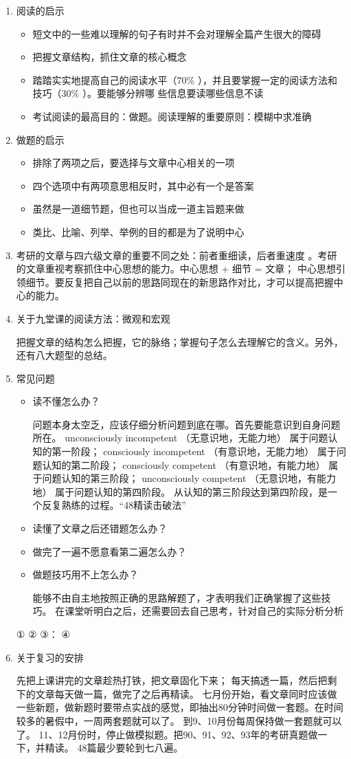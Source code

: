 \documentclass[11pt,twoside,openany,x11names,svgnames]{memoir}
\begin{document}
\begin{enumerate}
  \item 阅读的启示
  \begin{itemize}
  \item 短文中的一些难以理解的句子有时并不会对理解全篇产生很大的障碍
  \item 把握文章结构，抓住文章的核心概念
  \item 踏踏实实地提高自己的阅读水平（70\% ），并且要掌握一定的阅读方法和技巧（30\% ）。要能够分辨哪
些信息要读哪些信息不读
  \item 考试阅读的最高目的：做题。阅读理解的重要原则：模糊中求准确
\end{itemize}
  \item 做题的启示
  \begin{itemize}
  \item 排除了两项之后，要选择与文章中心相关的一项
  \item 四个选项中有两项意思相反时，其中必有一个是答案
  \item 虽然是一道细节题，但也可以当成一道主旨题来做
  \item 类比、比喻、列举、举例的目的都是为了说明中心
\end{itemize}
  \item 考研的文章与四六级文章的重要不同之处：前者重细读，后者重速度 。考研的文章重视考察抓住中心思想的能力。中心思想 + 细节 = 文章；  中心思想引领细节。要反复把自己以前的思路同现在的新思路作对比，才可以提高把握中心的能力。
  \item 关于九堂课的阅读方法：微观和宏观

  把握文章的结构怎么把握，它的脉络；掌握句子怎么去理解它的含义。另外，还有八大题型的总结。
  \item 常见问题
  \begin{itemize}
  \item 读不懂怎么办？

问题本身太空乏，应该仔细分析问题到底在哪。首先要能意识到自身问题所在。
unconsciously incompetent （无意识地，无能力地） 属于问题认知的第一阶段；
consciously incompetent （有意识地，无能力地） 属于问题认知的第二阶段；
consciously competent （有意识地，有能力地） 属于问题认知的第三阶段；
unconsciously competent （无意识地，有能力地） 属于问题认知的第四阶段。
从认知的第三阶段达到第四阶段，是一个反复熟练的过程。“48精读击破法”
  \item 读懂了文章之后还错题怎么办？
  \item 做完了一遍不愿意看第二遍怎么办？
  \item 做题技巧用不上怎么办？

能够不由自主地按照正确的思路解题了，才表明我们正确掌握了这些技巧。
在课堂听明白之后，还需要回去自己思考，针对自己的实际分析分析
\end{itemize}
①
②
③：
④
  \item 关于复习的安排

先把上课讲完的文章趁热打铁，把文章固化下来；
每天搞透一篇，然后把剩下的文章每天做一篇，做完了之后再精读。
七月份开始，看文章同时应该做一些新题，做新题时要带点实战的感觉，即抽出80分钟时间做一套题。在时间较多的暑假中，一周两套题就可以了。
到9、10月份每周保持做一套题就可以了。
11、12月份时，停止做模拟题。把90、91、92、93年的考研真题做一下，并精读。
48篇最少要轮到七八遍。
\end{enumerate}
\end{document}
